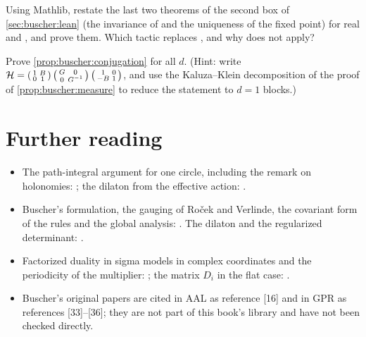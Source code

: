\begin{exercise}\label{exr:buscher:leanreal}
Using Mathlib, restate the last two theorems of the second box of
\cref{sec:buscher:lean} (the invariance of  and the uniqueness of the fixed
point) for real  and , and prove them. Which tactic replaces , and why
does  not apply?
\end{exercise}

\begin{exercise}[$\star\star\star$]\label{exr:buscher:conj}
Prove \cref{prop:buscher:conjugation} for all $d$. (Hint: write
$\mathcal{H}=\left(\begin{smallmatrix}1&B\\0&1\end{smallmatrix}\right)
\left(\begin{smallmatrix}G&0\\0&G^{-1}\end{smallmatrix}\right)
\left(\begin{smallmatrix}1&0\\-B&1\end{smallmatrix}\right)$, and use the Kaluza--Klein
decomposition of the proof of \cref{prop:buscher:measure} to reduce the statement to $d=1$
blocks.)
\end{exercise}

\section*{Further reading}
\begin{itemize}[leftmargin=*,itemsep=1pt]
\item The path-integral argument for one circle, including the remark on holonomies:
 ; the dilaton from the effective action:
 .
\item Buscher's formulation, the gauging of Ro\v{c}ek and Verlinde, the covariant form of the
 rules and the global analysis: . The dilaton and the
 regularized determinant: .
\item Factorized duality in sigma models in complex coordinates and the periodicity of the
 multiplier: ; the matrix $D_i$ in the flat case:
 .
\item Buscher's original papers are cited in AAL as reference [16] and in GPR as references
 [33]--[36]; they are not part of this book's library and have not been checked directly.
\end{itemize}
